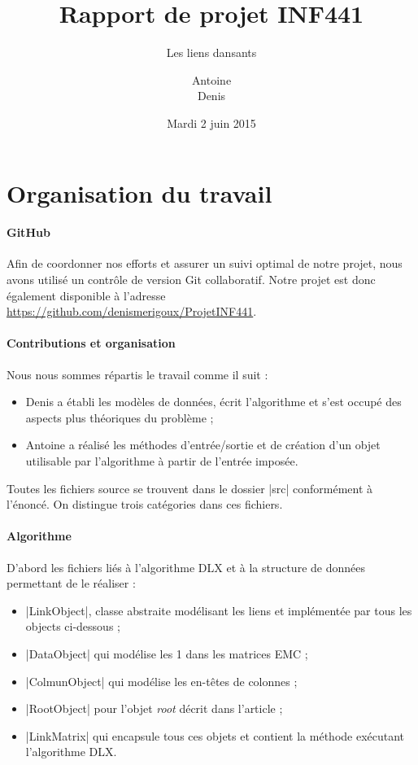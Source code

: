\documentclass[11pt,french,a4paper]{article}
\title{Rapport de projet INF441}
\subtitle{Les liens dansants}
\author{Antoine \bsc{Berthier}\\ Denis \bsc{Merigoux}}
\date{Mardi 2 juin 2015}
\begin{document}
\maketitle

\section{Organisation du travail}

\paragraph{GitHub} Afin de coordonner nos efforts et assurer un suivi optimal de notre projet, nous avons utilisé un contrôle de version Git collaboratif. Notre projet est donc également disponible à l'adresse \url{https://github.com/denismerigoux/ProjetINF441}.

\paragraph{Contributions et organisation} Nous nous sommes répartis le travail comme il suit :
\begin{itemize}
	\item Denis a établi les modèles de données, écrit l'algorithme et s'est occupé des aspects plus théoriques du problème ;
	\item Antoine a réalisé les méthodes d'entrée/sortie et de création d'un objet utilisable par l'algorithme à partir de l'entrée imposée.
\end{itemize}

Toutes les fichiers source se trouvent dans le dossier |src| conformément à l'énoncé. On distingue trois catégories dans ces fichiers.

\paragraph{Algorithme} D'abord les fichiers liés à l'algorithme DLX et à la structure de données permettant de le réaliser :
\begin{itemize}
	\item |LinkObject|, classe abstraite modélisant les liens et implémentée par tous les objects ci-dessous ;
	\item |DataObject| qui modélise les 1 dans les matrices EMC ;
	\item |ColmunObject| qui modélise les en-têtes de colonnes ;
	\item |RootObject| pour l'objet \emph{root} décrit dans l'article ;
	\item |LinkMatrix| qui encapsule tous ces objets et contient la méthode exécutant l'algorithme DLX.
\end{itemize}
\end{document}
